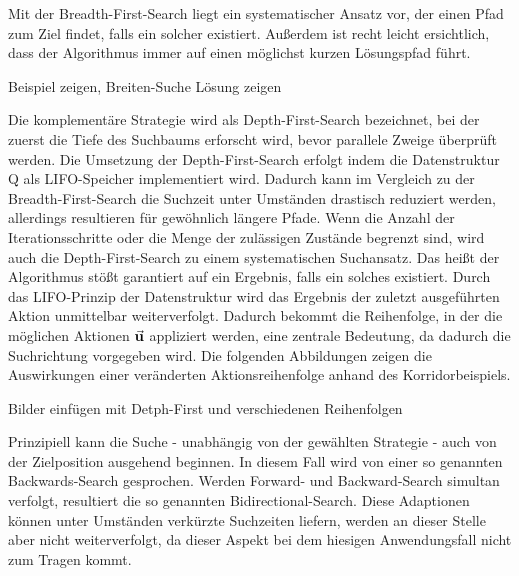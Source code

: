 Mit der Breadth-First-Search liegt ein systematischer Ansatz vor, der einen Pfad zum Ziel findet, falls ein solcher existiert. Außerdem ist recht leicht ersichtlich, dass der Algorithmus immer auf einen möglichst kurzen Lösungspfad führt.

{\color{red} Beispiel zeigen, Breiten-Suche Lösung zeigen}

Die komplementäre Strategie wird als Depth-First-Search bezeichnet, bei der zuerst die Tiefe des Suchbaums erforscht wird, bevor parallele Zweige überprüft werden. Die Umsetzung der Depth-First-Search erfolgt indem die Datenstruktur Q als LIFO-Speicher implementiert wird. Dadurch kann im Vergleich zu der Breadth-First-Search die Suchzeit unter Umständen drastisch reduziert werden, allerdings resultieren für gewöhnlich längere Pfade. Wenn die Anzahl der Iterationsschritte oder die Menge der zulässigen Zustände begrenzt sind, wird auch die Depth-First-Search zu einem systematischen Suchansatz. Das heißt der Algorithmus stößt garantiert auf ein Ergebnis, falls ein solches existiert. Durch das LIFO-Prinzip der Datenstruktur wird das Ergebnis der zuletzt ausgeführten Aktion unmittelbar weiterverfolgt. Dadurch bekommt die Reihenfolge, in der die möglichen Aktionen $\vec{\mathbf{u}}$ appliziert werden, eine zentrale Bedeutung, da dadurch die Suchrichtung vorgegeben wird. Die folgenden Abbildungen zeigen die Auswirkungen einer veränderten Aktionsreihenfolge anhand des Korridorbeispiels.

{\color{red} Bilder einfügen mit Detph-First und verschiedenen Reihenfolgen}

Prinzipiell kann die Suche - unabhängig von der gewählten Strategie - auch von der Zielposition ausgehend beginnen. In diesem Fall wird von einer so genannten Backwards-Search gesprochen. Werden Forward- und Backward-Search simultan verfolgt, resultiert die so genannten Bidirectional-Search. Diese Adaptionen können unter Umständen verkürzte Suchzeiten liefern, werden an dieser Stelle aber nicht weiterverfolgt, da dieser Aspekt bei dem hiesigen Anwendungsfall nicht zum Tragen kommt.

